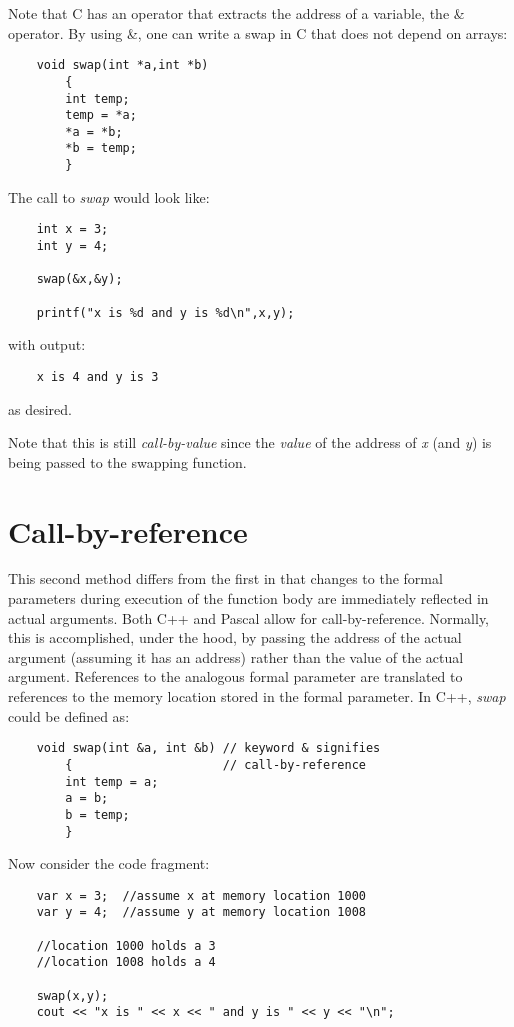 Note that C has an operator that extracts the address of a variable, the
\& operator. By using \&, one can write a swap in C that does
not depend on arrays:

\begin{verbatim}
    void swap(int *a,int *b)
        {
        int temp;
        temp = *a;
        *a = *b;
        *b = temp;
        }
\end{verbatim}

The call to {\it swap} would look like:

\begin{verbatim}
    int x = 3;
    int y = 4;

    swap(&x,&y);

    printf("x is %d and y is %d\n",x,y);
\end{verbatim}

with output:

\begin{verbatim}
    x is 4 and y is 3
\end{verbatim}

as desired.

Note that this is still {\it call-by-value} since the {\it value} of the
address of {\it x} (and {\it y}) is being passed to the swapping function.

\section*{Call-by-reference}

This second method differs from the first in that changes to
the formal parameters during execution of the function body are
immediately reflected in actual arguments. Both C++ and Pascal allow
for call-by-reference. Normally, this is accomplished,
under the hood, by passing the
address of the actual argument (assuming it has an address) rather than
the value of the actual argument. References to the analogous formal
parameter are translated to references to the memory location stored in
the formal parameter. In C++, {\it swap} could be defined as:

\begin{verbatim}
    void swap(int &a, int &b) // keyword & signifies
        {                     // call-by-reference
        int temp = a;
        a = b;
        b = temp;
        }
\end{verbatim}

Now consider the code fragment:

\begin{verbatim}
    var x = 3;  //assume x at memory location 1000
    var y = 4;  //assume y at memory location 1008

    //location 1000 holds a 3
    //location 1008 holds a 4

    swap(x,y);
    cout << "x is " << x << " and y is " << y << "\n";
\end{verbatim}

